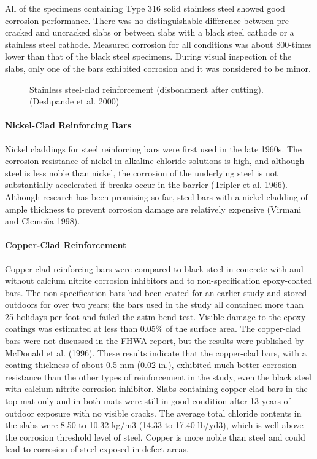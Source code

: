 All of the specimens containing Type 316 solid stainless steel showed good corrosion performance. There was
no distinguishable difference between pre-cracked and uncracked slabs or between slabs with a black steel cathode or
a stainless steel cathode. Measured corrosion for all conditions was about 800-times lower than that of the black
steel specimens. During visual inspection of the slabs, only one of the bars exhibited corrosion and it was considered
to be minor.

\begin{figure}
  \caption{Stainless steel-clad reinforcement (disbondment after cutting). (Deshpande et al.
  2000)}\label{fig:stainless-reinforcement}
\end{figure}

\paragraph{Nickel-Clad Reinforcing Bars}
Nickel claddings for steel reinforcing bars were first used in the late 1960s. The corrosion resistance of nickel in alkaline chloride solutions is high, and although steel is less noble than nickel, the corrosion of the underlying steel is not substantially accelerated if breaks occur in the barrier (Tripler et al. 1966). Although research has been promising so far, steel bars with a nickel cladding of ample thickness to prevent corrosion damage are relatively expensive (Virmani and Clemeña 1998).


\paragraph{Copper-Clad Reinforcement}
Copper-clad reinforcing bars were compared to black steel in concrete with and without calcium nitrite corrosion inhibitors and to non-specification epoxy-coated bars. The non-specification bars had been coated for an earlier study and stored outdoors for over two years; the bars used in the study all contained more than 25 holidays per foot and failed the \acrshort*{astm} bend test. Visible damage to the epoxy-coatings was estimated at less than 0.05\% of the surface area. The copper-clad bars were not discussed in the FHWA report, but the results were published by McDonald et al. (1996). These results indicate that the copper-clad bars, with a coating thickness of about 0.5 mm (0.02 in.), exhibited much better corrosion resistance than the other types of reinforcement in the study, even the black steel with calcium nitrite corrosion inhibitor. Slabs containing copper-clad bars in the top mat only and in both mats were still in good condition after 13 years of outdoor exposure with no visible cracks. The average total chloride contents in the slabs were 8.50 to 10.32 kg/m3 (14.33 to 17.40 lb/yd3), which is well above the corrosion threshold level of steel. Copper is more noble than steel and could lead to corrosion of steel exposed in defect areas.

